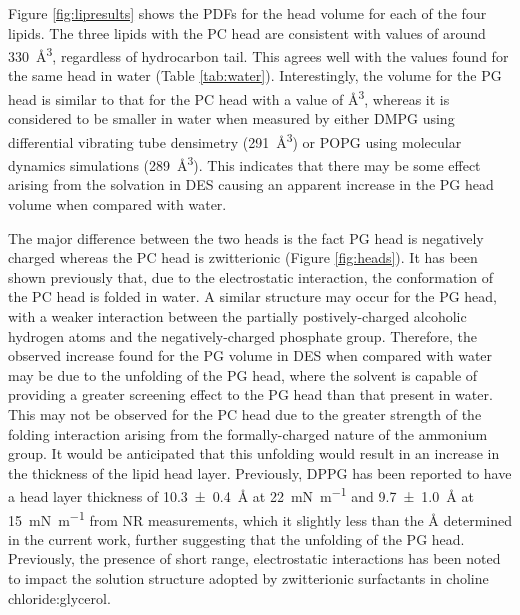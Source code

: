 \documentclass[twocolumn,a4paper]{paper}
\begin{document}
Figure \ref{fig:lipresults} shows the PDFs for the head volume for each of the four lipids.
The three lipids with the PC head are consistent with values of around \SI{330}{\cubic\angstrom}, regardless of hydrocarbon tail.
This agrees well with the values found for the same head in water (Table \ref{tab:water}).
Interestingly, the volume for the PG head is similar to that for the PC head with a value of \si{\cubic\angstrom}, whereas it is considered to be smaller in water when measured by either DMPG using differential vibrating tube densimetry\cite{Pan2012} (\SI{291}{\cubic\angstrom}) or POPG using molecular dynamics simulations\cite{Kucerka2012} (\SI{289}{\cubic\angstrom}).
This indicates that there may be some effect arising from the solvation in DES causing an apparent increase in the PG head volume when compared with water.

The major difference between the two heads is the fact PG head is negatively charged whereas the PC head is zwitterionic (Figure \ref{fig:heads}).
It has been shown previously that, due to the electrostatic interaction, the conformation of the PC head is folded in water\cite{Gilliams2016}.
A similar structure may occur for the PG head, with a weaker interaction between the partially postively-charged alcoholic hydrogen atoms and the negatively-charged phosphate group.
Therefore, the observed increase found for the PG volume in DES when compared with water may be due to the unfolding of the PG head, where the solvent is capable of providing a greater screening effect to the PG head than that present in water.
This may not be observed for the PC head due to the greater strength of the folding interaction arising from the formally-charged nature of the ammonium group.
It would be anticipated that this unfolding would result in an increase in the thickness of the lipid head layer.
Previously, DPPG has been reported to have a head layer thickness of \SI[separate-uncertainty=true]{10.3\pm0.4}{\angstrom} at \SI{22}{\milli\newton\per\meter} \cite{Clifton2012} and \SI[separate-uncertainty=true]{9.7\pm1.0}{\angstrom} at \SI{15}{\milli\newton\per\meter} \cite{Ciumac2017} from NR measurements, which it slightly less than the \si{\angstrom} determined in the current work, further suggesting that the unfolding of the PG head.
Previously, the presence of short range, electrostatic interactions has been noted to impact the solution structure adopted by zwitterionic surfactants in choline chloride:glycerol\cite{Sanchez-Fernandez2018}.
\end{document}
